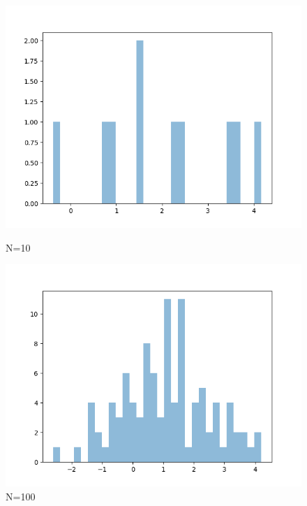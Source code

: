 \documentclass{article}
\begin{document}
\begin{multicols}{2}
    
    \begin{figure}[H]
        \centering
        \begin{minipage}{0.32\textwidth}
            \centering
            \includegraphics[width=\textwidth]{figures/1.2/dataset_1.png}
            \caption{N=10}
        \end{minipage}
        \hfill
        \begin{minipage}{0.32\textwidth}
            \centering
            \includegraphics[width=\textwidth]{figures/1.2/dataset_2.png}
            \caption{N=100}
        \end{minipage}
        \hfill
        \begin{minipage}{0.32\textwidth}
            \centering

\end{minipage}
\end{figure}
\end{multicols}
\end{document}

